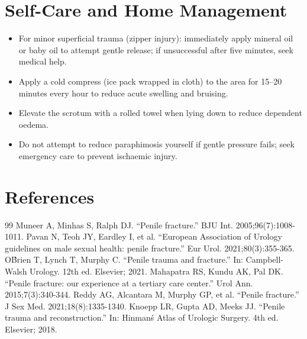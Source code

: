 \section*{Self-Care and Home Management}
\begin{itemize}
  \item For minor superficial trauma (zipper injury): immediately apply mineral oil or baby oil to attempt gentle release; if unsuccessful after five minutes, seek medical help.
  \item Apply a cold compress (ice pack wrapped in cloth) to the area for 15--20 minutes every hour to reduce acute swelling and bruising.
  \item Elevate the scrotum with a rolled towel when lying down to reduce dependent oedema.
  \item Do not attempt to reduce paraphimosis yourself if gentle pressure fails; seek emergency care to prevent ischaemic injury.
\end{itemize}

\section*{References}
\begin{thebibliography}{99}
 Muneer A, Minhas S, Ralph DJ. ``Penile fracture.'' BJU Int. 2005;96(7):1008-1011.
 Pavan N, Teoh JY, Eardley I, et al. ``European Association of Urology guidelines on male sexual health: penile fracture.'' Eur Urol. 2021;80(3):355-365.
 O\'Brien T, Lynch T, Murphy C. ``Penile trauma and fracture.'' In: Campbell-Walsh Urology. 12th ed. Elsevier; 2021.
 Mahapatra RS, Kundu AK, Pal DK. ``Penile fracture: our experience at a tertiary care center.'' Urol Ann. 2015;7(3):340-344.
 Reddy AG, Alcantara M, Murphy GP, et al. ``Penile fracture.'' J Sex Med. 2021;18(8):1335-1340.
 Knoepp LR, Gupta AD, Meeks JJ. ``Penile trauma and reconstruction.'' In: Hinman\'s Atlas of Urologic Surgery. 4th ed. Elsevier; 2018.
\end{thebibliography}
